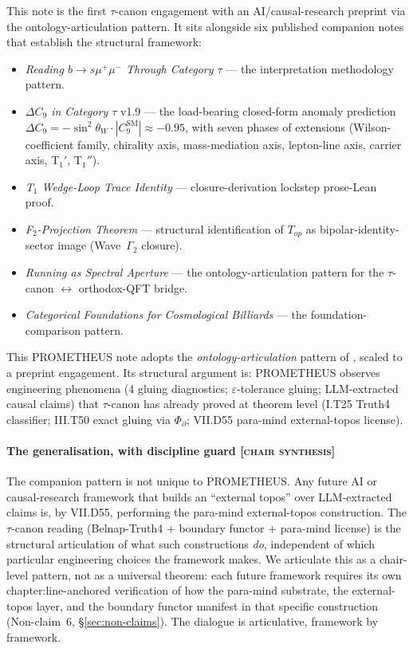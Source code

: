\documentclass{pantarhei-researchnote}
\newcommand{\SYNT}{\textsc{[chair synthesis]}}
\newcommand{\PsiD}{\ensuremath{\Phi_{\partial}}}
\begin{document}
This note is the first $\tau$-canon engagement with an AI/causal-research
preprint via the ontology-articulation pattern. It sits alongside
six published companion notes that establish the structural
framework:

\begin{itemize}
\item \cite{FuchsFuchs-bsmm-interpretation-v1} \emph{Reading
$b\to s\mu^{+}\mu^{-}$ Through Category $\tau$} --- the interpretation
methodology pattern.
\item \cite{FuchsFuchs-bsmm-anomaly-v19} \emph{$\Delta C_{9}$ in
Category $\tau$} v1.9 --- the load-bearing closed-form anomaly
prediction $\Delta C_{9} = -\sin^{2}\theta_{W} \cdot
|C_{9}^{\mathrm{SM}}| \approx -0.95$, with seven phases of
extensions (Wilson-coefficient family, chirality axis, mass-mediation
axis, lepton-line axis, carrier axis, T$_{1}'$, T$_{1}''$).
\item \cite{FuchsFuchs-T1-v1} \emph{T$_{1}$ Wedge-Loop Trace
Identity} --- closure-derivation lockstep prose-Lean proof.
\item \cite{FuchsFuchs-F2-projection-v1} \emph{F$_{2}$-Projection
Theorem} --- structural identification of $T_{op}$ as
bipolar-identity-sector image (Wave~$\Gamma_{2}$ closure).
\item \cite{FuchsFuchs-running-aperture-v1} \emph{Running as
Spectral Aperture} --- the ontology-articulation pattern for the
$\tau$-canon $\leftrightarrow$ orthodox-QFT bridge.
\item \cite{FuchsFuchs-foundations-billiards-v1} \emph{Categorical
Foundations for Cosmological Billiards} --- the foundation-comparison
pattern.
\end{itemize}

This PROMETHEUS note adopts the \emph{ontology-articulation}
pattern of \cite{FuchsFuchs-running-aperture-v1}, scaled to a
preprint engagement. Its structural argument is: PROMETHEUS
observes engineering phenomena (4 gluing diagnostics; $\varepsilon$-tolerance
gluing; LLM-extracted causal claims) that $\tau$-canon has already
proved at theorem level (I.T25 Truth4 classifier; III.T50 exact
gluing via $\PsiD$; VII.D55 para-mind external-topos license).

\paragraph{The generalisation, with discipline guard \SYNT}
The companion pattern is not unique to PROMETHEUS. Any future AI
or causal-research framework that builds an ``external topos'' over
LLM-extracted claims is, by VII.D55, performing the para-mind
external-topos construction. The $\tau$-canon reading
(Belnap-Truth4 + boundary functor + para-mind license) is the
structural articulation of what such constructions \emph{do},
independent of which particular engineering choices the framework
makes. We articulate this as a chair-level pattern, not as a
universal theorem: each future framework requires its own
chapter:line-anchored verification of how the para-mind
substrate, the external-topos layer, and the boundary functor
manifest in that specific construction (Non-claim~6,
\S\ref{sec:non-claims}). The dialogue is articulative, framework
by framework.
\end{document}
